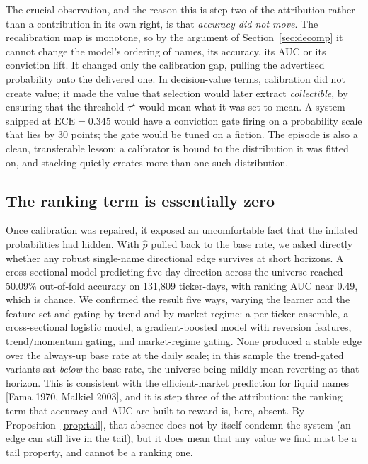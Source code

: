 \documentclass[10pt,a4paper,oneside]{article}
\theoremstyle{definition}
\theoremstyle{plain}
\newcommand{\ece}{\mathrm{ECE}}
\newcommand{\Pup}{\hat p}
\begin{document}
The crucial observation, and the reason this is step two of the attribution rather than
a contribution in its own right, is that \emph{accuracy did not move}. The
recalibration map is monotone, so by the argument of Section~\ref{sec:decomp} it cannot
change the model's ordering of names, its accuracy, its AUC or its conviction lift. It
changed only the calibration gap, pulling the advertised probability onto the delivered
one. In decision-value terms, calibration did not create value; it made the value that
selection would later extract \emph{collectible}, by ensuring that the threshold
$\tau^\star$ would mean what it was set to mean. A system shipped at $\ece=0.345$ would
have a conviction gate firing on a probability scale that lies by 30 points; the gate
would be tuned on a fiction. The episode is also a clean, transferable lesson: a
calibrator is bound to the distribution it was fitted on, and stacking quietly creates
more than one such distribution.

\subsection{The ranking term is essentially zero}
\label{sec:ceiling}
Once calibration was repaired, it exposed an uncomfortable fact that the inflated
probabilities had hidden. With $\Pup$ pulled back to the base rate, we asked directly whether any robust
single-name directional edge survives at short horizons. A cross-sectional model
predicting five-day direction across the universe reached 50.09\% out-of-fold accuracy
on 131{,}809 ticker-days, with ranking AUC near 0.49, which is chance. We confirmed the result
five ways, varying the learner and the feature set and gating by trend and by market
regime: a per-ticker ensemble, a cross-sectional logistic model, a gradient-boosted
model with reversion features, trend/momentum gating, and market-regime gating. None
produced a stable edge over the always-up base rate at the daily scale; in this
sample the trend-gated variants sat \emph{below} the base rate, the universe being
mildly mean-reverting at that horizon. This is consistent with the efficient-market
prediction for liquid names [Fama 1970, Malkiel 2003], and it is step three of the
attribution: the ranking term that accuracy and AUC are built to reward is, here,
absent. By Proposition~\ref{prop:tail}, that absence does not by itself condemn the
system (an edge can still live in the tail), but it does mean that any value we find
must be a tail property, and cannot be a ranking one.
\end{document}
